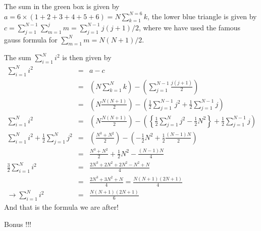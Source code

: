 \documentclass[aps,preprint,preprintnumbers,nofootinbib,showpacs,prd]{revtex4-1}
\newcommand{\nbea}{\begin{eqnarray*}}
\newcommand{\neea}{\end{eqnarray*}}
\begin{document}
The sum in the green box is given by $a = 6 \times (1 + 2 + 3 + 4 + 5 +6) = N\sum_{k=1}^{N=6} k$, the lower blue triangle is given by $c= \sum^{N-1}_{j=1} \sum_{m=1}^{j} m = \sum^{N-1}_{j=1} j(j+1)/2$, where we have used the famous gauss formula for $\sum_{m=1}^{N} m = N(N+1)/2$.

The sum $\sum_{i=1}^{N} i^2$ is then given by
%
\nbea
\sum_{i=1}^{N} i^2 & = & a - c \\
& = & \left ( N\sum_{k=1}^{N} k \right ) - \left ( \sum^{N-1}_{j=1} \frac{j(j+1)}{2} \right ) \\
& = & \left ( N \frac{N(N+1)}{2}\right ) - \left ( \frac{1}{2} \sum^{N-1}_{j=1} j^2 + \frac{1}{2} \sum^{N-1}_{j=1} j \right ) \\
\sum_{i=1}^{N} i^2 & = & \left ( N \frac{N(N+1)}{2}\right ) - \left ( \left \{ \frac{1}{2} \sum^{N}_{j=1} j^2 - \frac{1}{2} N^2 \right \} + \frac{1}{2} \sum^{N-1}_{j=1} j \right ) \\
\sum_{i=1}^{N} i^2 +  \frac{1}{2} \sum^{N}_{j=1} j^2 & = & \left ( \frac{N^3 + N^2}{2}\right ) - \left ( - \frac{1}{2} N^2 + \frac{1}{2} \frac{(N-1)N}{2} \right ) \\
& = & \frac{N^3 + N^2}{2} + \frac{1}{2} N^2 -  \frac{(N-1)N}{4} \\
\frac{3}{2} \sum^{N}_{i=1} i^2 & = &  \frac{2N^3 + 2N^2 + 2N^2 - N^2 + N}{4} \\
& = & \frac{2N^3 + 3N^2 + N}{4} = \frac{N(N+1)(2N+1)}{4} \\
\rightarrow \sum^{N}_{i=1} i^2 & = & \frac{N(N+1)(2N+1)}{6}
\neea
%
And that is the formula we are after!

Bonus !!!
\end{document}
